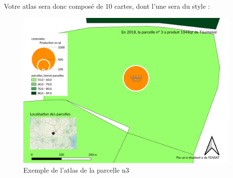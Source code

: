 Votre atlas sera donc composé de 10 cartes, dont l'une sera du style :

\begin{figure}
\centering
\includegraphics{figures/map_atlas.png}
\caption{Exemple de l'atlas de la parcelle n3}
\end{figure}
